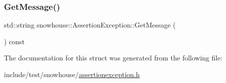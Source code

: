 \mbox{\label{structsnowhouse_1_1AssertionException_acbbf150f0c8c6ac170cbfb52dbdd9a44}} 
\subsubsection{\texorpdfstring{GetMessage()}{GetMessage()}}
{\footnotesize\ttfamily std\+::string snowhouse\+::\+Assertion\+Exception\+::\+Get\+Message (\begin{DoxyParamCaption}{ }\end{DoxyParamCaption}) const\hspace{0.3cm}{\ttfamily [inline]}}



The documentation for this struct was generated from the following file\+:\begin{DoxyCompactItemize}
\item 
include/test/snowhouse/\mbox{\hyperlink{assertionexception_8h}{assertionexception.\+h}}\end{DoxyCompactItemize}
